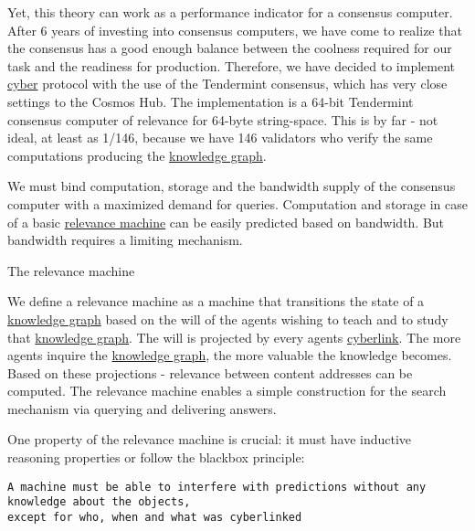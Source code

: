 \documentclass[8pt,oneside]{amsart}
\makeatletter
\newcommand{\linkred}[2]{\href{#1}{\color{red}{#2}}}
\newcommand{\linkgreen}[2]{\href{#1}{\color{green}{#2}}}
\renewcommand\subsection{\@startsection{subsection}
                                    {2}{\z@}
                                    {-3.25ex\@plus -1ex \@minus -.2ex}
                                    {0ex \@plus .2ex}
                                    {\play\Large}
                        }
\newcommand{\titleSection}[1]{\subsection{#1}}
\makeatother
\begin{document}
Yet, this theory can work as a performance indicator for a consensus computer. After 6 years of investing into consensus computers, we have come to realize that the \linkgreen{https://ipfs.io/ipfs/QmaMtD7xDgghqgjN62zWZ5TBGFiEjGQtuZBjJ9sMh816KJ}{Tendermint} consensus has a good enough balance between the coolness required for our task and the readiness for production. Therefore, we have decided to implement {\hyperref[cyber]{cyber}} protocol with the use of the Tendermint consensus, which has very close settings to the Cosmos Hub. The \linkred{https://github.com/cybercongress/cyberd}{cyberd} implementation is a 64-bit Tendermint consensus computer of relevance for 64-byte string-space. This is by far - not ideal, at least as 1/146, because we have 146 validators who verify the same computations producing the {\hyperref[knowledge-graph]{knowledge graph}}.

We must bind computation, storage and the bandwidth supply of the consensus computer with a maximized demand for queries. Computation and storage in case of a basic {\hyperref[relevance-machine]{relevance machine}} can be easily predicted based on bandwidth. But bandwidth requires a limiting mechanism.

\titleSection{The relevance machine}\label{relevance-machine}

We define a relevance machine as a machine that transitions the state of a {\hyperref[knowledge-graph]{knowledge graph}} based on the will of the agents wishing to teach and to study that {\hyperref[knowledge-graph]{knowledge graph}}. The will is projected by every agents {\hyperref[cyberlinks]{cyberlink}}. The more agents inquire the {\hyperref[knowledge-graph]{knowledge graph}}, the more valuable the knowledge becomes. Based on these projections - relevance between content addresses can be computed. The relevance machine enables a simple construction for the search mechanism via querying and delivering answers.

One property of the relevance machine is crucial: it must have inductive reasoning properties or follow the blackbox principle:

\begin{lstlisting}
A machine must be able to interfere with predictions without any knowledge about the objects,
except for who, when and what was cyberlinked
\end{lstlisting}
\end{document}
